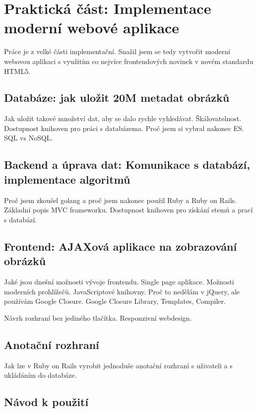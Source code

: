 \chapter{Praktická část: Implementace moderní webové aplikace}

Práce je z velké části implementační. Snažil jsem se tedy vytvořit moderní webovou aplikaci s využitím co nejvíce frontendových novinek v novém standardu HTML5.

\section{Databáze: jak uložit 20M metadat obrázků}

Jak uložit takové množství dat, aby se dalo rychle vyhledávat. Škálovatelnost. Dostupnost knihoven pro práci s databázema. Proč jsem si vybral nakonec ES. SQL vs NoSQL.

\section{Backend a úprava dat: Komunikace s databází, implementace algoritmů}

Proč jsem zkoušel golang a proč jsem nakonec použil Ruby a Ruby on Rails. Základní popis MVC frameworku. Dostupnost knihoven pro získání stemů a prací s databází.

\section{Frontend: AJAXová aplikace na zobrazování obrázků}

Jaké jsou dnešní možnosti vývoje frontendu. Single page aplikace. Možnosti moderních prohlížečů. JavaScriptové knihovny. Proč to nedělám v jQuery, ale používám Google Closure. Google Closure Library, Templates, Compiler.

Návrh rozhraní bez jediného tlačítka. Responzivní webdesign.

\section{Anotační rozhraní}

Jak lze v Ruby on Rails vyrobit jednoduše anotační rozhraní s uživateli a s ukládáním do databáze.

\section{Návod k použití}

